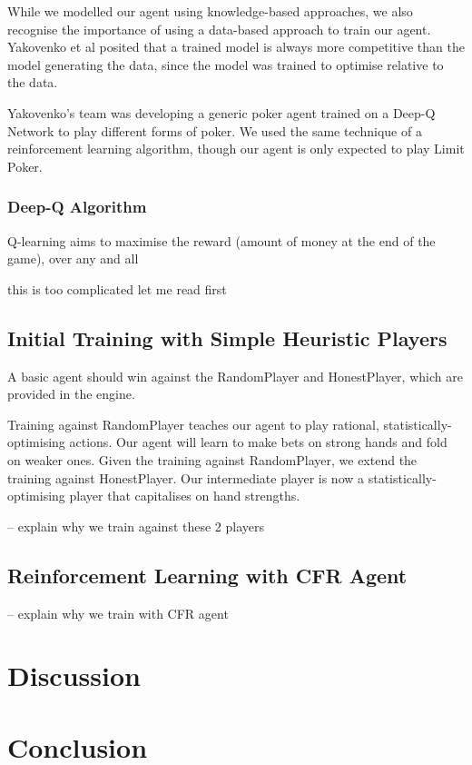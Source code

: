 \documentclass{article}
\begin{document}
While we modelled our agent using knowledge-based approaches, we also recognise the importance of using a data-based approach to train our agent. Yakovenko et al posited that a trained model is always more competitive than the model generating the data, since the model was trained to optimise relative to the data. 

Yakovenko's team was developing a generic poker agent trained on a Deep-Q Network to play different forms of poker. We used the same technique of a reinforcement learning algorithm, though our agent is only expected to play Limit Poker.

\subsubsection{Deep-Q Algorithm}
Q-learning aims to maximise the reward (amount of money at the end of the game), over any and all

this is too complicated let me read first


\subsection{Initial Training with Simple Heuristic Players}
A basic agent should win against the RandomPlayer and HonestPlayer, which are provided in the engine.

Training against RandomPlayer teaches our agent to play rational, statistically-optimising actions. Our agent will learn to make bets on strong hands and fold on weaker ones. Given the training against RandomPlayer, we extend the training against HonestPlayer. Our intermediate player is now a statistically-optimising player that capitalises on hand strengths.

-- explain why we train against these 2 players

\subsection{Reinforcement Learning with CFR Agent}

-- explain why we train with CFR agent

\section{Discussion}


\section{Conclusion}
\end{document}
